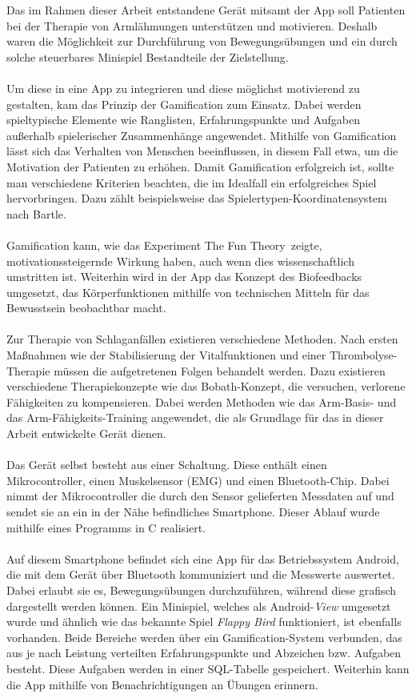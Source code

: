 Das im Rahmen dieser Arbeit entstandene Gerät mitsamt der App soll Patienten bei der Therapie von Armlähmungen unterstützen und motivieren. Deshalb waren die Möglichkeit zur Durchführung von Bewegungsübungen und ein durch solche steuerbares Minispiel Bestandteile der Zielstellung. \\ \\
Um diese in eine App zu integrieren und diese möglichst motivierend zu gestalten, kam das Prinzip der Gamification zum Einsatz. Dabei werden spieltypische Elemente wie Ranglisten, Erfahrungspunkte und Aufgaben außerhalb spielerischer Zusammenhänge angewendet. Mithilfe von Gamification lässt sich das Verhalten von Menschen beeinflussen, in diesem Fall etwa, um die Motivation der Patienten zu erhöhen. Damit Gamification erfolgreich ist, sollte man verschiedene Kriterien beachten, die im Idealfall ein erfolgreiches Spiel hervorbringen. Dazu zählt beispielsweise das Spielertypen-Koordinatensystem nach Bartle. \\ \\
Gamification kann, wie das Experiment \glqq The Fun Theory\grqq ~zeigte, motivationssteigernde Wirkung haben, auch wenn dies wissenschaftlich umstritten ist. Weiterhin wird in der App das Konzept des Biofeedbacks umgesetzt, das Körperfunktionen mithilfe von technischen Mitteln für das Bewusstsein beobachtbar macht. \\ \\
Zur Therapie von Schlaganfällen existieren verschiedene Methoden. Nach ersten Maßnahmen wie der Stabilisierung der Vitalfunktionen und einer Thrombolyse-Therapie müssen die aufgetretenen Folgen behandelt werden. Dazu existieren verschiedene Therapiekonzepte wie das Bobath-Konzept, die versuchen, verlorene Fähigkeiten zu kompensieren. Dabei werden Methoden wie das Arm-Basis- und das Arm-Fähigkeits-Training angewendet, die als Grundlage für das in dieser Arbeit entwickelte Gerät dienen. \\ \\
Das Gerät selbst besteht aus einer Schaltung. Diese enthält einen Mikrocontroller, einen Muskelsensor (EMG) und einen Bluetooth-Chip. Dabei nimmt der Mikrocontroller die durch den Sensor gelieferten Messdaten auf und sendet sie an ein in der Nähe befindliches Smartphone. Dieser Ablauf wurde mithilfe eines Programms in C realisiert.\\ \\
Auf diesem Smartphone befindet sich eine App für das Betriebssystem Android, die mit dem Gerät über Bluetooth kommuniziert und die Messwerte auswertet. Dabei erlaubt sie es, Bewegungsübungen durchzuführen, während diese grafisch dargestellt werden können. Ein Minispiel, welches als Android-\textit{View} umgesetzt wurde und ähnlich wie das bekannte Spiel \textit{Flappy Bird} funktioniert, ist ebenfalls vorhanden. Beide Bereiche werden über ein Gamification-System verbunden, das aus je nach Leistung verteilten Erfahrungspunkte und Abzeichen bzw. Aufgaben besteht. Diese Aufgaben werden in einer SQL-Tabelle gespeichert. Weiterhin kann die App mithilfe von Benachrichtigungen an Übungen erinnern. \\ \\
